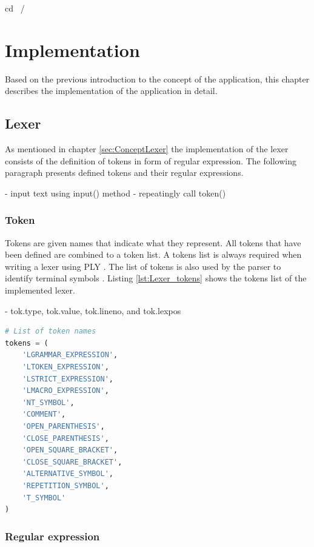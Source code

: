 cd ~/%


\chapter{Implementation}\label{cha:Implementation}

Based on the previous introduction to the concept of the application, this chapter describes the implementation of the application in detail.

\section{Lexer}\label{sec:ImplementationLexer}

As mentioned in chapter \ref{sec:ConceptLexer} the implementation of the lexer consists of the definition of tokens in form of regular expression. The following paragraph presents defined tokens and their regular expressions.

- input text using input() method
- repeatingly call token()

\subsection{Token}\label{sec:ImplementationLexerToken}

Tokens are given names that indicate what they represent. All tokens that have been defined are combined to a token list.   A tokens list is always required when writing a lexer using \ac{PLY} \cite{PLY}. The list of tokens is also used by the parser to identify terminal symbols \cite{PLY}. Listing \ref{lst:Lexer_tokens} shows the tokens list of the implemented lexer.

-  tok.type, tok.value, tok.lineno, and tok.lexpos \\

\begin{lstlisting}[language=Python,basicstyle=\scriptsize	,caption= Lexer tokens,label= lst:Lexer_tokens]
# List of token names
tokens = (
    'LGRAMMAR_EXPRESSION',
    'LTOKEN_EXPRESSION',
    'LSTRICT_EXPRESSION',
    'LMACRO_EXPRESSION',
    'NT_SYMBOL',
    'COMMENT',
    'OPEN_PARENTHESIS',
    'CLOSE_PARENTHESIS',
    'OPEN_SQUARE_BRACKET',
    'CLOSE_SQUARE_BRACKET',
    'ALTERNATIVE_SYMBOL',
    'REPETITION_SYMBOL',
    'T_SYMBOL'
)
\end{lstlisting}

\subsection{Regular expression}\label{sec:ImplementationLexerRegularExpression}

